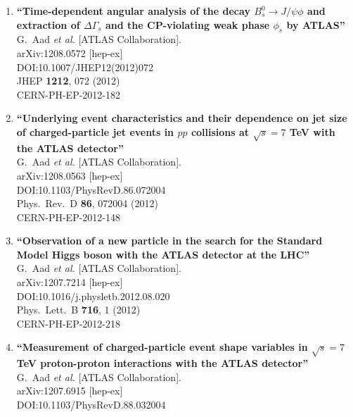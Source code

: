 \documentclass{article}
\begin{document}
\begin{enumerate}
\item%
{\bf ``Time-dependent angular analysis of the decay $B_{s}^{0} \to J/{\psi\phi}$ and extraction of $\Delta\Gamma_{s}$ and the CP-violating weak phase $\phi_s$ by ATLAS''}
  \\{}G.~Aad {\it et al.} [ATLAS Collaboration].
  \\{}arXiv:1208.0572 [hep-ex]
  \\{}DOI:10.1007/JHEP12(2012)072
  \\{}JHEP {\bf 1212}, 072 (2012)
  \\{}CERN-PH-EP-2012-182
\item%
{\bf ``Underlying event characteristics and their dependence on jet size of charged-particle jet events in $pp$ collisions at $\sqrt{s}=7$ TeV with the ATLAS detector''}
  \\{}G.~Aad {\it et al.} [ATLAS Collaboration].
  \\{}arXiv:1208.0563 [hep-ex]
  \\{}DOI:10.1103/PhysRevD.86.072004
  \\{}Phys.\ Rev.\ D {\bf 86}, 072004 (2012)
  \\{}CERN-PH-EP-2012-148
\item%
{\bf ``Observation of a new particle in the search for the Standard Model Higgs boson with the ATLAS detector at the LHC''}
  \\{}G.~Aad {\it et al.} [ATLAS Collaboration].
  \\{}arXiv:1207.7214 [hep-ex]
  \\{}DOI:10.1016/j.physletb.2012.08.020
  \\{}Phys.\ Lett.\ B {\bf 716}, 1 (2012)
  \\{}CERN-PH-EP-2012-218
\item%
{\bf ``Measurement of charged-particle event shape variables in $\sqrt{s}=7$ TeV proton-proton interactions with the ATLAS detector''}
  \\{}G.~Aad {\it et al.} [ATLAS Collaboration].
  \\{}arXiv:1207.6915 [hep-ex]
  \\{}DOI:10.1103/PhysRevD.88.032004

\end{enumerate}
\end{document}

